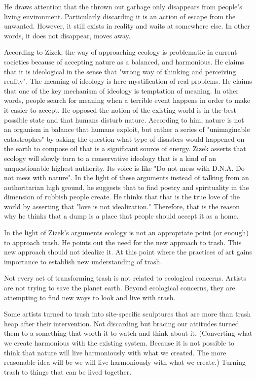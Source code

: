 He draws attention that the thrown out garbage only disappears from people's living environment. Particularly discarding it is an action of escape from the unwanted. However, it still exists in reality and waits at somewhere else. In other words, it does not disappear, moves away.

According to Zizek, the way of approaching ecology is problematic in current societies because of accepting nature as a balanced, and harmonious. He claims that it is ideological in the sense that "wrong way of thinking and perceiving reality". The meaning of ideology is here mystification of real problems. He claims that one of the key mechanism of ideology is temptation of meaning. In other words, people search for meaning when a terrible event happens in order to make it easier to accept. He opposed the notion of the existing world is in the best possible state and that humans disturb nature. According to him, nature is not an organism in balance that humans exploit, but rather a series of "unimaginable catastrophes" by asking the question what type of disasters would happened on the earth to compose oil that is a significant source of energy. Zizek asserts that ecology will slowly turn to a conservative ideology that is a kind of an unquestionable highest authority. Its voice is like "Do not mess with D.N.A. Do not mess with nature". In the light of these arguments instead of talking from an authoritarian high ground, he suggests that to find poetry and spirituality in the dimension of rubbish people create. He thinks that that is the true love of the world by asserting that "love is not idealization." Therefore, that is the reason why he thinks that a dump is a place that people should accept it as a home. 

In the light of Zizek's arguments ecology is not an appropriate point (or enough) to approach trash. He points out the need for the new approach to trash. This new approach should not idealize it. At this point where the practices of art gains importance to establish new understanding of trash.

Not every act of transforming trash is not related to ecological concerns. Artists are not trying to save the planet earth. Beyond ecological concerns, they are attempting to find new ways to look and live with trash. 

Some artists turned to trash into site-specific sculptures that are more than trash heap after their intervention. Not discarding but bracing our attitudes turned them to a something that worth it to watch and think about it. (Converting what we create harmonious with the existing system. Because it is not possible to think that nature will live harmoniously with what we created. The more reasonable idea will be we will live harmoniously with what we create.) Turning trash to things that can be lived together.

